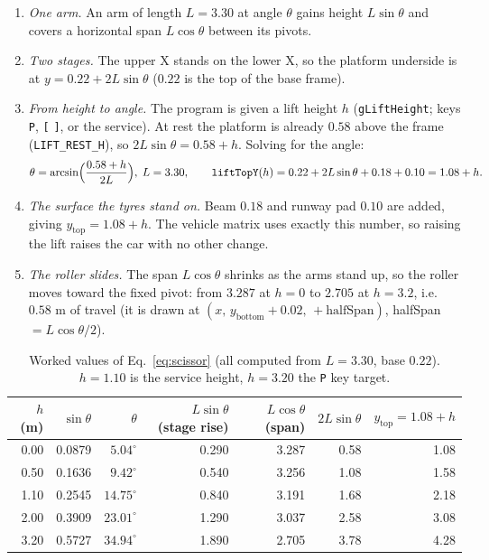 \documentclass[10pt,a4paper]{article}
\newcommand{\fn}[1]{\texttt{#1}}
\let\oldtoprule\toprule
\renewcommand{\toprule}{\oldtoprule\rowcolor{smhead}}
\begin{document}
\begin{enumerate}[leftmargin=*,label=\textbf{\arabic*.}]
\item \emph{One arm.} An arm of length $L=3.30$ at angle $\theta$ gains height $L\sin\theta$ and covers a horizontal span $L\cos\theta$ between its pivots.
\item \emph{Two stages.} The upper X stands on the lower X, so the platform underside is at $y=0.22+2L\sin\theta$ ($0.22$ is the top of the base frame).
\item \emph{From height to angle.} The program is given a lift height $h$ (\fn{gLiftHeight}; keys \fn{P}, \fn{[} \fn{]}, or the service). At rest the platform is
already $0.58$ above the frame (\fn{LIFT\_REST\_H}), so $2L\sin\theta=0.58+h$. Solving for the angle:
\begin{equation}\theta=\arcsin\!\Big(\frac{0.58+h}{2L}\Big),\;L=3.30,\qquad \text{\fn{liftTopY}}(h)=0.22+2L\sin\theta+0.18+0.10=1.08+h .\label{eq:scissor}\end{equation}
\item \emph{The surface the tyres stand on.} Beam $0.18$ and runway pad $0.10$ are added, giving $y_{\text{top}}=1.08+h$. The vehicle matrix uses exactly this
number, so raising the lift raises the car with no other change.
\item \emph{The roller slides.} The span $L\cos\theta$ shrinks as the arms stand up, so the roller moves toward the fixed pivot: from $3.287$ at $h=0$ to $2.705$ at
$h=3.2$, i.e.\ $0.58$ m of travel (it is drawn at $(x,\,y_{\text{bottom}}+0.02,\,+\text{halfSpan})$, halfSpan $=L\cos\theta/2$).
\end{enumerate}
\begin{table}[!htbp]\centering\scriptsize
\caption{Worked values of Eq.~\eqref{eq:scissor} (all computed from $L=3.30$, base $0.22$). $h=1.10$ is the service height, $h=3.20$ the \fn{P} key target.}\label{tab:liftvalues}
\begin{tabular}{@{}rrrrrrr@{}}\toprule
$h$ (m) & $\sin\theta$ & $\theta$ & $L\sin\theta$ (stage rise) & $L\cos\theta$ (span) & $2L\sin\theta$ & $y_{\text{top}}=1.08+h$\\\midrule
0.00 & 0.0879 & $5.04^\circ$ & 0.290 & 3.287 & 0.58 & 1.08\\
0.50 & 0.1636 & $9.42^\circ$ & 0.540 & 3.256 & 1.08 & 1.58\\
1.10 & 0.2545 & $14.75^\circ$ & 0.840 & 3.191 & 1.68 & 2.18\\
2.00 & 0.3909 & $23.01^\circ$ & 1.290 & 3.037 & 2.58 & 3.08\\
3.20 & 0.5727 & $34.94^\circ$ & 1.890 & 2.705 & 3.78 & 4.28\\\bottomrule
\end{tabular}
\end{table}
\end{document}
